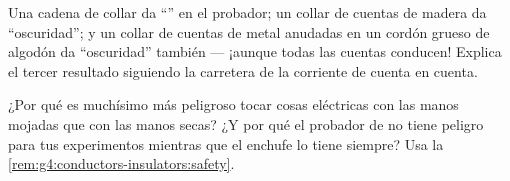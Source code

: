 \begin{exercise}[$\star\star$]\label{exo:g4:conductors-insulators:10}
Una cadena de collar da ``'' en el probador; un collar de cuentas
de madera da ``oscuridad''; y un collar de cuentas de metal anudadas
en un cordón grueso de algodón da ``oscuridad'' también --- ¡aunque
todas las cuentas conducen! Explica el tercer resultado siguiendo la
carretera de la corriente de cuenta en cuenta.
\end{exercise}

\begin{exercise}[$\star\star$]\label{exo:g4:conductors-insulators:11}
¿Por qué es muchísimo más peligroso tocar cosas eléctricas con las
manos mojadas que con las manos secas? ¿Y por qué el probador de
 no tiene peligro para tus experimentos mientras que el enchufe
lo tiene siempre? Usa la \cref{rem:g4:conductors-insulators:safety}.
\end{exercise}
